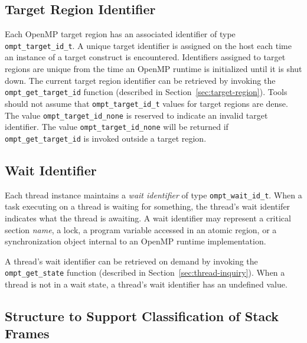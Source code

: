 \documentclass{article}
\begin{document}
\subsection{Target Region Identifier}
Each OpenMP target region has an associated identifier of type \verb|ompt_target_id_t|. 
A unique target identifier is assigned on the host each time an instance of a target construct is encountered.  
Identifiers assigned to target regions are unique from the time an OpenMP runtime is initialized until it is shut down. 
The current target region identifier can be retrieved by invoking the \verb|ompt_get_target_id| function (described in Section~\ref{sec:target-region}).
Tools should not assume that \verb|ompt_target_id_t| values for target regions are dense. 
The value \verb|ompt_target_id_none| is reserved to indicate an invalid target identifier. The value \verb|ompt_target_id_none| will be returned if \verb|ompt_get_target_id| is invoked outside a target region.

\subsection{Wait Identifier}
Each thread instance maintains a {\em wait identifier} of type \verb|ompt_wait_id_t|. 
When a task executing on a thread is waiting for something, the thread's wait identifer indicates what the thread is awaiting. 
A wait identifier may represent a critical section {\em name}, a lock,  a program variable accessed in an atomic region, or a synchronization object internal to an OpenMP runtime implementation. 

A thread's wait identifier can be retrieved on demand by invoking the \verb|ompt_get_state| function (described in Section~\ref{sec:thread-inquiry}).
When a thread is not in a wait state, a thread's wait identifier has an undefined value.
 
\subsection{Structure to Support Classification of Stack Frames}
\end{document}
